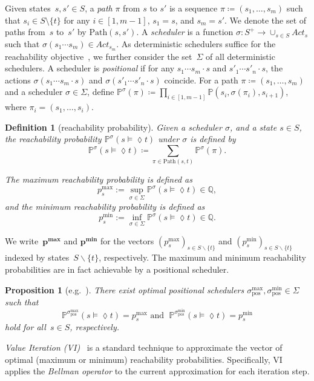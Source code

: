 \documentclass[preprint,12pt]{elsarticle}
\theoremstyle{plain}
\newtheorem{proposition}[theorem]{Proposition}
\newtheorem{definition}[theorem]{Definition}
\theoremstyle{definition}
\theoremstyle{remark}
\theoremstyle{claimstyle}
\newcommand{\prob}{\mathbb{P}}
\newcommand{\QQ}{\mathbb{Q}}
\newcommand{\pathset}[2]{\mathrm{Path}(#1, #2)}
\begin{document}
Given states~$s,s' \in S$,
a \emph{path} $\pi$ from $s$ to $s'$ is a sequence $\pi \coloneqq (s_1,\dots, s_m)$ such that $s_i\in S\setminus \{t\} $ for any $i\in [1, m-1]$, $s_1 = s$, and $s_m  = s'$.
We denote the set of paths from~$s$ to~$s'$ by $\pathset{s}{s'}$. 
A \emph{scheduler} is a function $\sigma\colon S^{+}\rightarrow \cup_{s\in S}Act_s$ such that $\sigma(s_1\cdots s_m)\in Act_{s_m}$. %
As deterministic schedulers suffice for the reachability objective~\cite{bk}, we further consider
the set~$\Sigma$ of all deterministic schedulers. 
A scheduler is \emph{positional} if for any $s_1\cdots s_m\cdot s$ and $s'_1\cdots s'_n\cdot s$, the actions $\sigma(s_1\cdots s_m\cdot s)$ and 
$\sigma(s'_1\cdots s'_n\cdot s)$ coincide. 
For a path $\pi \coloneqq (s_1,\dots, s_m)$ and a scheduler $\sigma \in \Sigma$, %
define $\prob^{\sigma}(\pi)\coloneqq \prod_{i\in [1, m-1]} \prob(s_i, \sigma(\pi_i), s_{i+1})$, where %
$\pi_i = (s_1,\dots, s_i)$. 
\begin{definition}[reachability probability]
	Given a scheduler $\sigma$, and a state $s\in S$, the \emph{reachability probability} $\prob^\sigma(s \models \lozenge t)$ under $\sigma$ is defined by 
	\[\prob^\sigma(s \models \lozenge t)\coloneqq \sum_{\pi \in \pathset{s}{t}} \prob^{\sigma}(\pi).\] 
	
	The \emph{maximum reachability probability} is defined as \[p^{\mathrm{max}}_s:=\sup_{\sigma\in \Sigma} \prob^\sigma(s \models \lozenge t) \in \QQ,\] 
	and the \emph{minimum reachability probability} is defined as \[p^{\mathrm{min}}_s:=\inf_{\sigma\in \Sigma} \prob^\sigma(s \models \lozenge t) \in \QQ.\] 
\end{definition}
We write~$\bm{p^{\max}}$ and $\bm{p^{\min}}$ for the vectors $(p^{\max}_s)_{s \in S\backslash \{t\}}$ and $(p^{\min}_s)_{s \in S\backslash \{t\}}$ indexed by states~$S\backslash \{t\}$, respectively.
The maximum and minimum reachability probabilities are in fact achievable by a positional scheduler. 
\begin{proposition}[e.g.~\cite{bk}] %
	\label{vi-positional}
	There exist optimal positional schedulers $\sigma^{\max}_\text{pos}, \sigma^{\min}_\text{pos} \in \Sigma$ such that
	\[\prob^{\sigma^{\max}_\text{pos}}(s \models \lozenge t) = p^{\max}_s \text{ and } \;
	\prob^{\sigma^{\min}_\text{pos}}(s \models \lozenge t) = p^{\min}_s\] hold for all~$s \in S$, respectively.
\end{proposition}
\emph{Value Iteration (VI)}~\cite{bk,Puterman94} is a standard technique to approximate the vector of optimal (maximum or minimum) reachability probabilities. 
Specifically, VI applies the \emph{Bellman operator} to the current approximation for each iteration step. 
\end{document}
